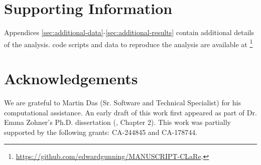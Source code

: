 \section*{Supporting Information}

Appendices \ref{sec:additional-data}-\ref{sec:additional-results} contain additional details of the analysis.
 code scripts and data to reproduce the analysis are available at \footnote{ \url{https://github.com/edwardgunning/MANUSCRIPT-CLaRe}.}

\section*{Acknowledgements}
We are grateful to Martin Das (Sr. Software and Technical Specialist) for his computational assistance.
An early draft of this work first appeared as part of Dr. Emma Zohner's Ph.D. dissertation (\citeyear{zohner_feature_2021}, Chapter 2).
This work was partially supported by the following grants: CA-244845 and CA-178744.